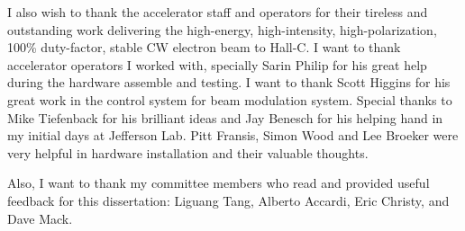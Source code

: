 I also wish to thank the accelerator staff and operators for their tireless and outstanding work delivering the high-energy, high-intensity, high-polarization, 100\% duty-factor, stable CW electron beam to Hall-C. I want to thank accelerator operators I worked with, specially Sarin Philip for his great help during the hardware assemble and testing. I want to thank Scott Higgins for his great work in the control system for beam modulation system. Special thanks to Mike Tiefenback for his brilliant ideas and Jay Benesch for his helping hand in my initial days at Jefferson Lab. Pitt Fransis, Simon Wood and Lee Broeker were very helpful in hardware installation and their valuable thoughts.

Also, I want to thank my committee members who read and provided useful feedback for this dissertation: Liguang Tang, Alberto Accardi, Eric Christy, and Dave Mack.

